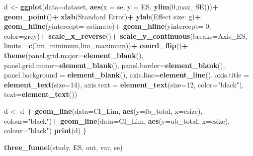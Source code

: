 \documentclass[
]{book}
\newenvironment{Shaded}{\begin{snugshade}}{\end{snugshade}}
\newcommand{\AttributeTok}[1]{\textcolor[rgb]{0.13,0.29,0.53}{#1}}
\newcommand{\DecValTok}[1]{\textcolor[rgb]{0.00,0.00,0.81}{#1}}
\newcommand{\FunctionTok}[1]{\textcolor[rgb]{0.13,0.29,0.53}{\textbf{#1}}}
\newcommand{\NormalTok}[1]{#1}
\newcommand{\OtherTok}[1]{\textcolor[rgb]{0.56,0.35,0.01}{#1}}
\newcommand{\SpecialCharTok}[1]{\textcolor[rgb]{0.81,0.36,0.00}{\textbf{#1}}}
\newcommand{\StringTok}[1]{\textcolor[rgb]{0.31,0.60,0.02}{#1}}
\begin{document}
\begin{Shaded}
\begin{Highlighting}[]
\NormalTok{d }\OtherTok{\textless{}{-}} \FunctionTok{ggplot}\NormalTok{(}\AttributeTok{data=}\NormalTok{dataset, }\FunctionTok{aes}\NormalTok{(}\AttributeTok{x =}\NormalTok{ se, }\AttributeTok{y =}\NormalTok{ ES, }\FunctionTok{ylim}\NormalTok{(}\DecValTok{0}\NormalTok{,max\_SE)))}\SpecialCharTok{+}
  \FunctionTok{geom\_point}\NormalTok{()}\SpecialCharTok{+}
  \FunctionTok{xlab}\NormalTok{(}\StringTok{\textquotesingle{}Standard Error\textquotesingle{}}\NormalTok{)}\SpecialCharTok{+} 
  \FunctionTok{ylab}\NormalTok{(}\StringTok{\textquotesingle{}Effect size: g\textquotesingle{}}\NormalTok{)}\SpecialCharTok{+}
  \FunctionTok{geom\_hline}\NormalTok{(}\AttributeTok{yintercept=}\NormalTok{ estimate)}\SpecialCharTok{+}
  \FunctionTok{geom\_hline}\NormalTok{(}\AttributeTok{yintercept=} \DecValTok{0}\NormalTok{, }\AttributeTok{color=}\StringTok{\textquotesingle{}grey\textquotesingle{}}\NormalTok{)}\SpecialCharTok{+}
  \FunctionTok{scale\_x\_reverse}\NormalTok{()}\SpecialCharTok{+}
  \FunctionTok{scale\_y\_continuous}\NormalTok{(}\AttributeTok{breaks=}\NormalTok{Axis\_ES, }\AttributeTok{limits =}\FunctionTok{c}\NormalTok{(lim\_minimum,lim\_maximum))}\SpecialCharTok{+}
  \FunctionTok{coord\_flip}\NormalTok{()}\SpecialCharTok{+}
  \FunctionTok{theme}\NormalTok{(}\AttributeTok{panel.grid.major=}\FunctionTok{element\_blank}\NormalTok{(),}
        \AttributeTok{panel.grid.minor=}\FunctionTok{element\_blank}\NormalTok{(),}
        \AttributeTok{panel.border=}\FunctionTok{element\_blank}\NormalTok{(),}
        \AttributeTok{panel.background =} \FunctionTok{element\_blank}\NormalTok{(),}
        \AttributeTok{axis.line=}\FunctionTok{element\_line}\NormalTok{(),}
        \AttributeTok{axis.title =} \FunctionTok{element\_text}\NormalTok{(}\AttributeTok{size=}\DecValTok{14}\NormalTok{),}
        \AttributeTok{axis.text =} \FunctionTok{element\_text}\NormalTok{(}\AttributeTok{size=}\DecValTok{12}\NormalTok{, }\AttributeTok{color=}\StringTok{"black"}\NormalTok{),}
        \AttributeTok{text=}\FunctionTok{element\_text}\NormalTok{())}

\NormalTok{d }\OtherTok{\textless{}{-}}\NormalTok{ d }\SpecialCharTok{+} \FunctionTok{geom\_line}\NormalTok{(}\AttributeTok{data=}\NormalTok{CI\_Lim, }\FunctionTok{aes}\NormalTok{(}\AttributeTok{y=}\NormalTok{lb\_total, }\AttributeTok{x=}\NormalTok{csize), }\AttributeTok{colour=}\StringTok{"black"}\NormalTok{)}\SpecialCharTok{+}
  \FunctionTok{geom\_line}\NormalTok{(}\AttributeTok{data=}\NormalTok{CI\_Lim, }\FunctionTok{aes}\NormalTok{(}\AttributeTok{y=}\NormalTok{ub\_total, }\AttributeTok{x=}\NormalTok{csize), }\AttributeTok{colour=}\StringTok{"black"}\NormalTok{)}
\FunctionTok{print}\NormalTok{(d)}
\NormalTok{\}}

\FunctionTok{three\_funnel}\NormalTok{(study, ES, out, var, se)}
\end{Highlighting}
\end{Shaded}
\end{document}
